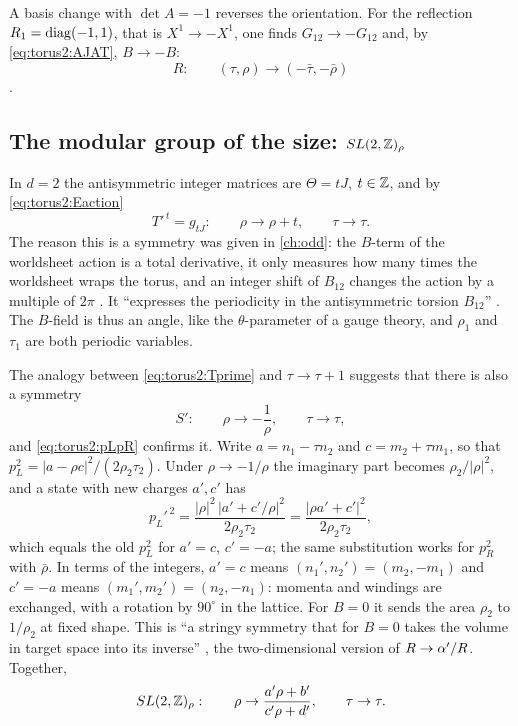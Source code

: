 A basis change with $\det A=-1$ reverses the orientation. For the reflection
$R_1=\operatorname{diag}(-1,1)$, that is $X^1\to-X^1$, one finds $G_{12}\to-G_{12}$ and, by
\eqref{eq:torus2:AJAT}, $B\to-B$:
\begin{equation}\label{eq:torus2:R}
 R:\qquad(\tau,\rho)\to(-\bar\tau,-\bar\rho)
\end{equation}
.

\subsection{The modular group of the size: \texorpdfstring{$SL(2,\mathbb{Z})_\rho$}{SL(2,Z) rho}}

In $d=2$ the antisymmetric integer matrices are $\Theta=tJ$, $t\in\mathbb{Z}$, and by
\eqref{eq:torus2:Eaction}
\begin{equation}\label{eq:torus2:Tprime}
 T'^{\,t}=g_{tJ}:\qquad \rho\to\rho+t,\qquad \tau\to\tau .
\end{equation}
The reason this is a symmetry was given in \cref{ch:odd}: the $B$-term of the worldsheet
action is a total derivative, it only measures how many times the worldsheet wraps the
torus, and an integer shift of $B_{12}$ changes the action by a multiple of $2\pi$
. It ``expresses the periodicity in the antisymmetric
torsion $B_{12}$'' . The $B$-field is thus an angle, like the
$\theta$-parameter of a gauge theory, and $\rho_1$ and $\tau_1$ are both periodic variables.

The analogy between \eqref{eq:torus2:Tprime} and $\tau\to\tau+1$ suggests that there is also
a symmetry
\begin{equation}\label{eq:torus2:Sprime}
 S':\qquad\rho\to-\frac1\rho,\qquad\tau\to\tau ,
\end{equation}
and \eqref{eq:torus2:pLpR} confirms it. Write $a=n_1-\tau n_2$ and $c=m_2+\tau m_1$, so that
$p_L^2=|a-\rho c|^2/(2\rho_2\tau_2)$. Under $\rho\to-1/\rho$ the imaginary part becomes
$\rho_2/|\rho|^2$, and a state with new charges $a',c'$ has
\[
 p_L'^{\,2}=\frac{|\rho|^2\,\big|a'+c'/\rho\big|^2}{2\rho_2\tau_2}
 =\frac{|\rho a'+c'|^2}{2\rho_2\tau_2},
\]
which equals the old $p_L^2$ for $a'=c$, $c'=-a$; the same substitution works for $p_R^2$
with $\bar\rho$. In terms of the integers, $a'=c$ means $(n_1',n_2')=(m_2,-m_1)$ and $c'=-a$
means $(m_1',m_2')=(n_2,-n_1)$: momenta and windings are exchanged, with a rotation by
$90^\circ$ in the lattice. For $B=0$ it sends the area $\rho_2$ to
$1/\rho_2$ at fixed shape. This is ``a stringy symmetry that for $B=0$ takes the volume in
target space into its inverse'' , the two-dimensional
version of $R\to\alpha'/R$. Together,
\begin{equation}\label{eq:torus2:SLrho}
 SL(2,\mathbb{Z})_\rho:\qquad \rho\to\frac{a'\rho+b'}{c'\rho+d'},\qquad\tau\to\tau .
\end{equation}

